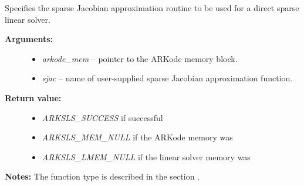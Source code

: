 \documentclass[letterpaper,10pt,english]{sphinxmanual}
\begin{document}
\begin{fulllineitems}
\label{c_interface/User_callable:c.ARKSlsSetSparseJacFn}
Specifies the sparse Jacobian approximation routine to
be used for a direct sparse linear solver.
\begin{description}
\item[{\textbf{Arguments:}}] \leavevmode\begin{itemize}
\item {} 
\emph{arkode\_mem} -- pointer to the ARKode memory block.

\item {} 
\emph{sjac} -- name of user-supplied sparse Jacobian approximation function.

\end{itemize}

\item[{\textbf{Return value:}}] \leavevmode\begin{itemize}
\item {} 
\emph{ARKSLS\_SUCCESS}  if successful

\item {} 
\emph{ARKSLS\_MEM\_NULL}  if the ARKode memory was 

\item {} 
\emph{ARKSLS\_LMEM\_NULL} if the linear solver memory was 

\end{itemize}

\end{description}

\textbf{Notes:} The function type {\hyperref[c_interface/User_supplied:c.ARKSlsSparseJacFn]{\emph{}}} is
described in the section {\hyperref[c_interface/User_supplied:cinterface-usersupplied]{\emph{}}}.

\end{fulllineitems}

\end{document}
